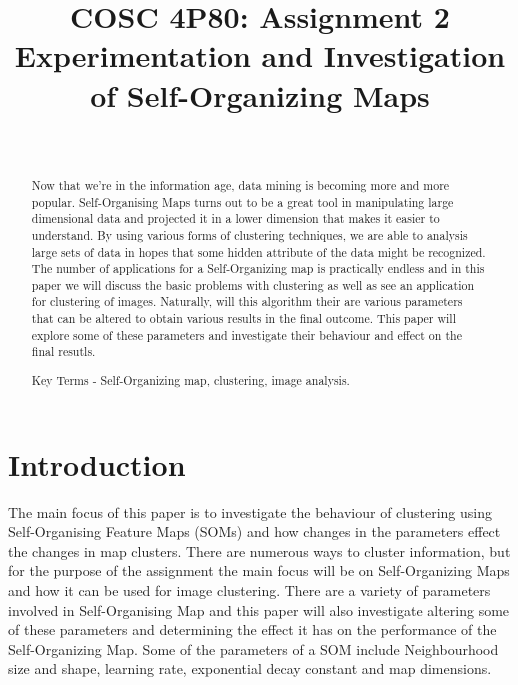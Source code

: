 \documentclass{IEEEtran}
\begin{document}
\title{COSC 4P80: Assignment 2 \\ Experimentation and Investigation of Self-Organizing Maps} %

\author{\\		%
}

\maketitle					%

\begin{abstract}
Now that we're in the information age, data mining is becoming more and more popular. Self-Organising Maps turns out to be a great tool in manipulating large dimensional data and projected it in a lower dimension that makes it easier to understand. By using various forms of clustering techniques, we are able to analysis large sets of data in hopes that some hidden attribute of the data might be recognized.  The number of applications for a Self-Organizing map is practically endless and in this paper we will discuss the basic problems with clustering as well as see an application for clustering of images. Naturally, will this algorithm their are various parameters that can be altered to obtain various results in the final outcome. This paper will explore some of these parameters and investigate their behaviour and effect on the final resutls.

Key Terms - Self-Organizing map, clustering, image analysis.   
\end{abstract}

\section{Introduction}{
	The main focus of this paper is to investigate the behaviour of clustering using Self-Organising Feature Maps (SOMs) and how changes in the parameters effect the changes in map clusters. There are numerous ways to cluster information, but for the purpose of the assignment the main focus will be on  Self-Organizing Maps and how it can be used for image clustering. There are a variety of parameters involved in Self-Organising Map and this paper will also investigate altering some of these parameters and determining the effect  it has on the performance of the Self-Organizing Map. Some of the parameters of a SOM include Neighbourhood size and shape, learning rate, exponential decay constant and map dimensions.
}
\end{document}
